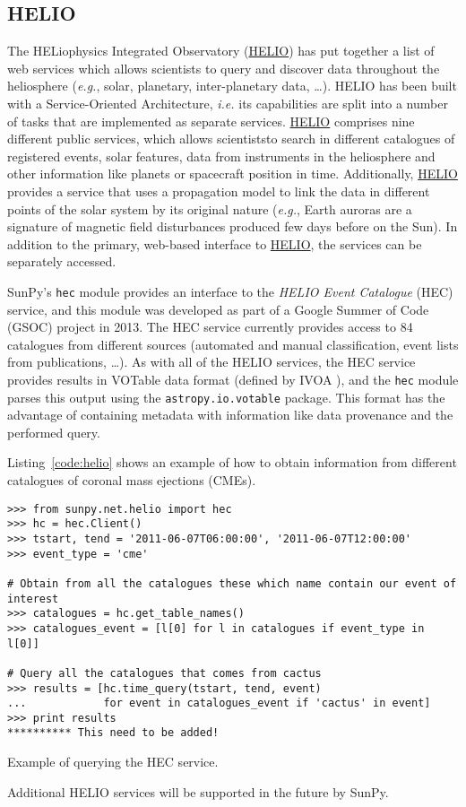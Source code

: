 \subsection{HELIO}\label{ssec:helio}

The HELiophysics Integrated Observatory (\href{http://helio-vo.eu}{HELIO}) has 
put together a list of web services which allows scientists to query and 
discover data throughout the heliosphere (\textit{e.g.}, solar, planetary, 
inter-planetary data, \ldots)\citep{dps2012}.
HELIO has been built with a Service-Oriented Architecture, 
\textit{i.e.} its capabilities are split into a number of tasks that are 
implemented as separate services. 
\href{http://helio-vo.eu}{HELIO} comprises nine different public services, 
which allows scientiststo search in different catalogues of registered events, 
solar features, data from instruments in the heliosphere and other information 
like planets or spacecraft position in time. 
Additionally, \href{http://helio-vo.eu}{HELIO} provides a service that uses a 
propagation model to link the data in different points of the solar system by 
its original nature (\textit{e.g.}, Earth auroras are a signature of magnetic 
field disturbances produced few days before on the Sun).
In addition to the primary, web-based interface to 
\href{http://helio-vo.eu}{HELIO}, the services can be separately accessed.

SunPy's \texttt{hec} module provides an interface to the
\textit{HELIO Event Catalogue} (HEC) service, and this module was developed as
part of a Google Summer of Code (GSOC) project in 2013.
The HEC service currently provides access to 84 catalogues from different
sources (automated and manual classification, event lists from publications, \ldots).
As with all of the HELIO services, the HEC service provides results in VOTable 
data format (defined by IVOA \cite{ochsenbein_ivoa_2011}), and the \texttt{hec}
module parses this output using the \texttt{astropy.io.votable} package.
This format has the advantage of containing metadata with information like
data provenance and the performed query.

Listing~\ref{code:helio} shows an example of how to obtain information
from different catalogues of coronal mass ejections (CMEs).

\begin{listing}[h]
\begin{verbatim}
>>> from sunpy.net.helio import hec
>>> hc = hec.Client()
>>> tstart, tend = '2011-06-07T06:00:00', '2011-06-07T12:00:00'
>>> event_type = 'cme'

# Obtain from all the catalogues these which name contain our event of interest
>>> catalogues = hc.get_table_names()
>>> catalogues_event = [l[0] for l in catalogues if event_type in l[0]]

# Query all the catalogues that comes from cactus
>>> results = [hc.time_query(tstart, tend, event) 
...            for event in catalogues_event if 'cactus' in event]
>>> print results
********** This need to be added!
\end{verbatim}
\caption{Example of querying the HEC service.}
\label{code:helio}
\end{listing}

Additional HELIO services will be supported in the future by SunPy.
